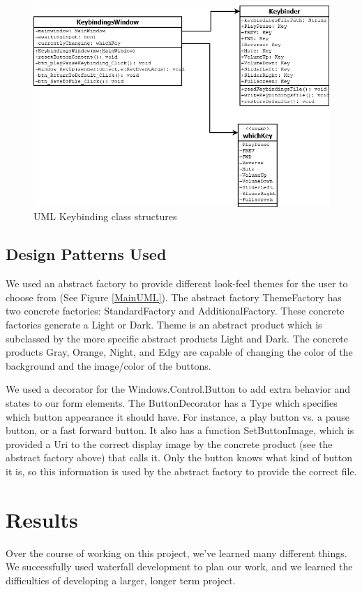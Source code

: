 \documentclass[10pt,conference,onecolumn,compsoc]{IEEEtran}
\begin{document}
\begin{figure}[H]
\begin{center}
\includegraphics[scale=0.4]{Keybinder.png}
\caption{UML Keybinding class structures}
\label{KeybinderUML}
\end{center}
\end{figure}

\subsection{Design Patterns Used}
We used an abstract factory to provide different look-feel themes for the user to choose from (See Figure \ref{MainUML}). The abstract factory ThemeFactory has two concrete factories: StandardFactory and AdditionalFactory. These concrete factories generate a Light or Dark. Theme is an abstract product which is subclassed by the more specific abstract products Light and Dark. The concrete products Gray, Orange, Night, and Edgy are capable of changing the color of the background and the image/color of the buttons. \medskip

We used a decorator for the Windows.Control.Button to add extra behavior and states to our form elements. The ButtonDecorator has a Type which specifies which button appearance it should have. For instance, a play button vs. a pause button, or a fast forward button. It also has a function SetButtonImage, which is provided a Uri to the correct display image by the concrete product (see the abstract factory above) that calls it. Only the button knows what kind of button it is, so this information is used by the abstract factory to provide the correct file.


\section{Results}
Over the course of working on this project, we've learned many different things. We successfully used waterfall development to plan our work, and we learned the difficulties of developing a larger, longer term project. \medskip
\end{document}
